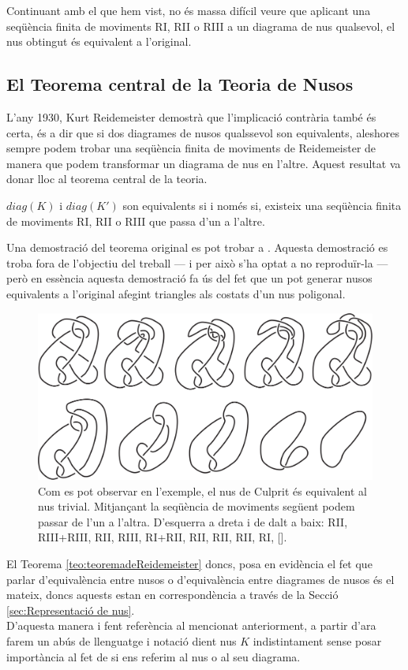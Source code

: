 Continuant amb el que hem vist, no és massa difícil veure que aplicant una seqüència finita de moviments RI, RII o RIII a un diagrama de nus qualsevol, el nus obtingut és equivalent a l'original.

\subsection{El Teorema central de la Teoria de Nusos}\label{sec:teoremacentraldelateoria}

L'any 1930, Kurt Reidemeister demostrà que l'implicació contrària també és certa, és a dir que si dos diagrames de nusos qualssevol son equivalents, aleshores sempre podem trobar una seqüència finita de moviments de Reidemeister de manera que podem transformar un diagrama de nus en l'altre. Aquest resultat va donar lloc al teorema central de la teoria.

\begin{theorem}\label{teo:teoremadeReidemeister}
   $diag(K)$ i $diag(K')$ son equivalents si i només si, existeix una seqüència finita de moviments RI, RII o RIII que passa d'un a l'altre.
\end{theorem}

Una demostració del teorema original es pot trobar a \cite{knotknotes}. Aquesta demostració es troba fora de l'objectiu del treball --- i per això s'ha optat a no reproduïr-la --- però en essència aquesta demostració fa ús del fet que un pot generar nusos equivalents a l'original afegint triangles als costats d'un nus poligonal.\\

\begin{figure}
	\centering
	\includegraphics[width=0.9\linewidth]{img/culprit-knot.png}
	\caption{Com es pot observar en l'exemple, el nus de Culprit és equivalent al nus trivial. Mitjançant la seqüència de moviments següent podem passar de l'un a l'altra. D'esquerra a dreta i de dalt a baix: RII, RIII+RIII, RII, RIII, RI+RII, RII, RII, RII, RI, [\cite{culpritknot}].}\label{fig:culpritknot}
\end{figure}

El Teorema \ref{teo:teoremadeReidemeister} doncs, posa en evidència el fet que parlar d'equivalència entre nusos o d'equivalència entre diagrames de nusos és el mateix, doncs aquests estan en correspondència a través de la Secció \ref{sec:Representació de nus}.\\

D'aquesta manera i fent referència al mencionat anteriorment, a partir d'ara farem un abús de llenguatge i notació dient nus $K$ indistintament sense posar importància al fet de si ens referim al nus o al seu diagrama.